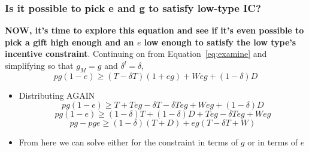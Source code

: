 \documentclass[12pt]{article}
\newcommand{\de}{\delta}
\begin{document}
\subsubsection{Is it possible to pick e and g to satisfy low-type IC?}

\textbf{NOW, it's time to explore this equation and see if it's even possible to pick a gift high enough and an $e$ low enough to satisfy the low type's incentive constraint}. Continuing on from Equation~\ref{eq:examine} and simplifying so that $g_M = g$ and $\de^l = \de$,
\[
	pg\left(1 - e\right) \geq \left(T - \de T \right) \left(1 + eg\right) + Weg + \left(1 - \de \right) D
\]
	\begin{itemize}
		\item Distributing AGAIN
			\[
				pg	\left(1 - e\right) \geq T + Teg - \de T - \de T eg + Weg + \left(1 - \de \right) D
			\]
			\[
				pg	\left(1 - e\right) \geq \left(1 - \de \right) T + \left(1 - \de \right) D + Teg - \de T eg + Weg
			\]
			\begin{equation}
				pg - pge \geq \left(1 - \de \right) \left( T + D \right) + eg \left( T - \de T + W \right)
				\label{eq:split}
			\end{equation}
		\item From here we can solve either for the constraint in terms of $g$ or in terms of $e$
	\end{itemize}		
			
\end{document}

